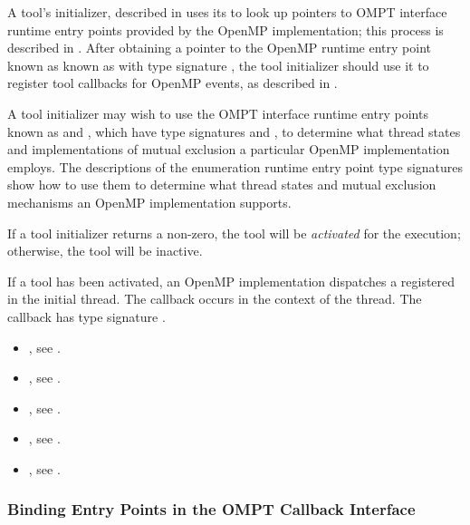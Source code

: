 A tool's initializer, described in 
uses its \callbackarg{}  to look up pointers
to OMPT interface runtime entry points provided by the OpenMP
implementation; this process is described in .
After obtaining a pointer to the OpenMP runtime entry point known as
known as  with type signature
, the tool initializer should use it to
register tool callbacks for OpenMP events, as described in
.

A tool initializer may wish to use the OMPT interface runtime
entry points known as  and
, which have type signatures
 and
, to determine what thread
states and implementations of mutual exclusion a particular OpenMP
implementation employs. The descriptions of the enumeration runtime entry point
type signatures show how to use them to determine what
thread states and mutual exclusion mechanisms an OpenMP implementation supports.

If a tool initializer returns a non-zero, the tool will be
\emph{activated} for the execution; otherwise, the tool will be
inactive.

If a tool has been activated, an OpenMP implementation dispatches
a registered  in the initial
thread. The callback occurs in the context of the thread.  The
callback has type signature .

\crossreferences
\begin{itemize}
\item {}, see .
\item {}, see .
\item {}, see .
\item {}, see .
\item {}, see
  .
\end{itemize}


\subsubsection{Binding Entry Points in the OMPT Callback Interface}
\label{sec:ompt-bind}

